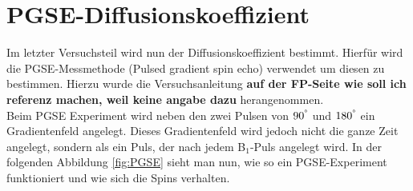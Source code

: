 \section{PGSE-Diffusionskoeffizient}
Im letzter Versuchsteil wird nun der Diffusionskoeffizient bestimmt. Hierfür wird die PGSE-Messmethode (Pulsed gradient spin echo) verwendet um diesen zu bestimmen. Hierzu wurde die Versuchsanleitung \textbf{auf der FP-Seite wie soll ich referenz machen, weil keine angabe dazu} herangenommen.\\
Beim PGSE Experiment wird neben den zwei Pulsen von $90^{\degree}$ und $180^{\degree}$ ein Gradientenfeld angelegt. Dieses Gradientenfeld wird jedoch nicht die ganze Zeit angelegt, sondern als ein Puls, der nach jedem B$_1$-Puls angelegt wird. In der folgenden Abbildung \ref{fig:PGSE} sieht man nun, wie so ein PGSE-Experiment funktioniert und wie sich die Spins verhalten. 

